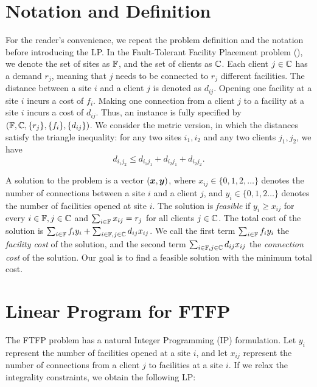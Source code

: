 \documentclass[oneside,final]{ucr}
\begin{document}
\section{Notation and Definition}
For the reader's convenience, we repeat the problem
definition and the notation before introducing the LP. In
the Fault-Tolerant Facility Placement problem ({\FTFP}), we
denote the set of sites as $\mathbb{F}$, and the set of
clients as $\mathbb{C}$. Each client $j \in \mathbb{C}$ has
a demand $r_j$, meaning that $j$ needs to be connected to
$r_j$ different facilities. The distance between a site $i$
and a client $j$ is denoted as $d_{ij}$. Opening one
facility at a site $i$ incurs a cost of $f_i$. Making one
connection from a client $j$ to a facility at a site $i$
incurs a cost of $d_{ij}$. Thus, an {\FTFP} instance is
fully specified by $(\mathbb{F}, \mathbb{C}, \{r_j\},
\{f_i\}, \{d_{ij}\})$. We consider the metric version, in
which the distances satisfy the triangle inequality: for any
two sites $i_1,i_2$ and any two clients $j_1,j_2$, we have
\begin{equation*}
  d_{i_1 j_2} \leq d_{i_1 j_1} + d_{i_2 j_1} + d_{i_2 j_2}.
\end{equation*} 

A solution to the {\FTFP} problem is a vector $(\boldsymbol{x},
\boldsymbol{y})$, where $x_{ij} \in \{0, 1, 2, \ldots\}$ denotes the
number of connections between a site $i$ and a client $j$,
and $y_i \in \{0, 1, 2\ldots\}$ denotes the number of
facilities opened at site $i$. The solution is
\emph{feasible} if $y_i \geq x_{ij}$ for every $i \in
\mathbb{F}, j \in \mathbb{C}$ and $\sum_{i\in\mathbb{F}}
x_{ij} = r_j$ for all clients $j \in \mathbb{C}$. The total
cost of the solution is $\sum_{i \in \mathbb{F}} f_i y_i +
\sum_{i \in \mathbb{F}, j \in \mathbb{C}} d_{ij} x_{ij}$. We
call the first term $\sum_{i \in \mathbb{F}} f_i y_i$ the
\emph{facility cost} of the solution, and the second term
$\sum_{i \in \mathbb{F}, j \in \mathbb{C}} d_{ij} x_{ij}$ the
\emph{connection cost} of the solution. Our goal is to find
a feasible solution with the minimum total cost.

\section{Linear Program for FTFP}
The FTFP problem has a natural Integer Programming (IP)
formulation. Let $y_i$ represent the number of facilities
opened at a site $i$, and let $x_{ij}$ represent the number
of connections from a client $j$ to facilities at a site
$i$. If we relax the integrality constraints, we obtain the
following LP:
\end{document}
